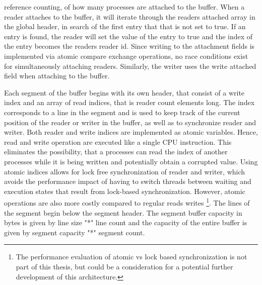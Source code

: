 reference counting, of how many processes are attached to the buffer. When a reader attaches to the buffer, it will iterate through the readers attached array in the global header, in search of the first entry that that is not
set to true. If an entry is found, the reader will set the value of the entry to true and the index of the entry becomes the readers reader id. Since writing to the attachment fields 
is implemented via atomic compare exchange operations, no race conditions exist for simultaneously attaching readers. Similarly, the writer uses the write attached field when attaching to the buffer.
\par
Each segment of the buffer begins with its own header, that consist of a write index and an array of read indices, that is reader count elements long.
The index corresponds to a line in the segment and is used to keep track of the current position of the reader or writer in the buffer, as well
as to synchronize reader and writer. Both reader and write indices are implemented as atomic variables. Hence, read and write operation 
are executed like a single CPU instruction. This eliminates the possibility, that a processes can read the index of another processes while it is being written and
potentially obtain a corrupted value. Using atomic indices allows for lock free synchronization of reader and writer, which avoids the performance impact of having to
switch threads between waiting and execution states that result from lock-based synchronization. However, atomic operations are also more costly compared to regular reads writes \footnote{The performance evaluation of atomic vs lock based synchronization is not part of this thesis, but could be a consideration for a potential further development of this architecture.}. 
The lines of the segment begin below the segment header. The segment buffer capacity in bytes is given by line size "*" line count and the capacity of the entire buffer is given by segment capacity "*" segment count.  


